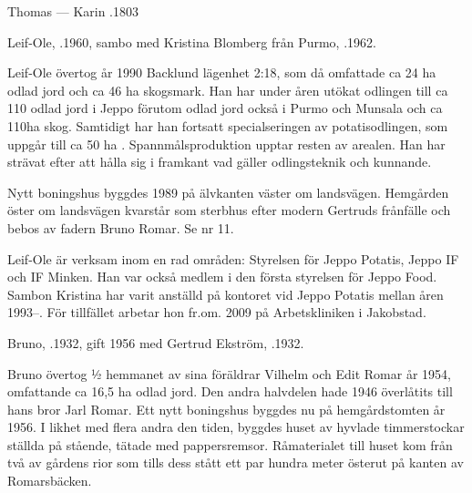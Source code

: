 Thomas   ---  Karin .1803






Leif-Ole, .1960, sambo med Kristina Blomberg från Purmo, .1962.
\begin{jhchildren}
  \item {}
  \item {}
\end{jhchildren}
Leif-Ole övertog år 1990 Backlund lägenhet 2:18, som då omfattade ca 24 ha odlad jord och ca 46 ha skogsmark. Han har under åren utökat odlingen till ca 110 odlad jord i Jeppo förutom odlad jord också i Purmo och Munsala och ca 110ha skog. Samtidigt har han fortsatt specialseringen av potatisodlingen, som uppgår till ca 50 ha . Spannmålsproduktion upptar resten av arealen. Han har strävat efter att hålla sig i framkant vad gäller odlingsteknik och kunnande.

Nytt boningshus byggdes 1989 på älvkanten väster om landsvägen. Hemgården öster om landsvägen kvarstår som sterbhus efter modern Gertruds frånfälle och bebos av fadern Bruno Romar. Se nr 11.

Leif-Ole är verksam inom en rad områden: Styrelsen för Jeppo Potatis, Jeppo IF och IF Minken. Han var också medlem i den första styrelsen för Jeppo Food. Sambon Kristina har varit anställd på kontoret vid Jeppo Potatis mellan åren 1993--. För tillfället arbetar hon fr.om. 2009 på Arbetskliniken i Jakobstad.






Bruno, .1932, gift 1956 med Gertrud Ekström, .1932.
\begin{jhchildren}
   \item {}
   \item {}
   \item {}
   \item {}
\end{jhchildren}
Bruno övertog ½ hemmanet av sina föräldrar Vilhelm och  Edit Romar år 1954, omfattande ca 16,5 ha odlad jord. Den andra halvdelen hade 1946 överlåtits till hans bror Jarl Romar. Ett nytt boningshus byggdes nu på hemgårdstomten år 1956. I likhet med flera andra den tiden, byggdes huset av hyvlade timmerstockar ställda på stående, tätade med pappersremsor. Råmaterialet till huset kom från två av gårdens rior som tills dess stått ett par hundra meter österut på kanten av Romarsbäcken.

